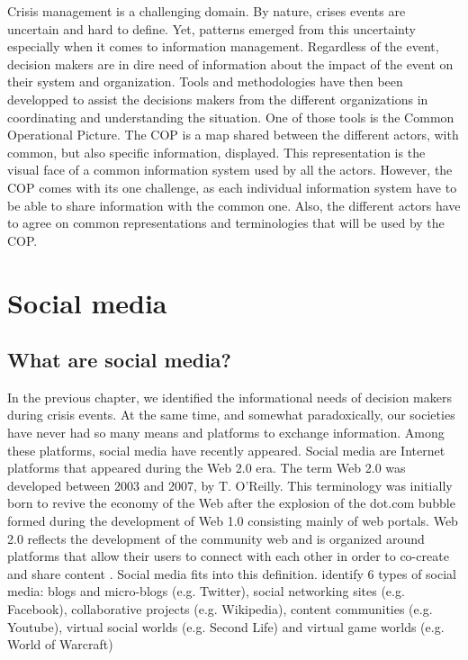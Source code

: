 Crisis management is a challenging domain.
By nature, crises events are uncertain and hard to define.
Yet, patterns emerged from this uncertainty especially when it comes to information management.
Regardless of the event, decision makers are in dire need of information about the impact of the event on their system and organization.
Tools and methodologies have then been developped to assist the decisions makers from the different organizations in coordinating and understanding the situation.
One of those tools is the Common Operational Picture.
The COP is a map shared between the different actors, with common, but also specific information, displayed.
This representation is the visual face of a common information system used by all the actors.
However, the COP comes with its one challenge, as each individual information system have to be able to share information with the common one.
Also, the different actors have to agree on common representations and terminologies that will be used by the COP.

\section{Social media}
\subsection{What are social media?}
In the previous chapter, we identified the informational needs of decision makers during crisis events.
At the same time, and somewhat paradoxically, our societies have never had so many means and platforms to exchange information.
Among these platforms, social media have recently appeared.
Social media are Internet platforms that appeared during the Web 2.0 era.
The term Web 2.0 was developed between 2003 and 2007, by T. O'Reilly.
This terminology was initially born to revive the economy of the Web after the explosion of the dot.com bubble formed during the development of Web 1.0 consisting mainly of web portals.
Web 2.0 reflects the development of the community web and is organized around platforms that allow their users to connect with each other in order to co-create and share content \cite{oreillyWhatWebDesign2007b}.
Social media fits into this definition.
\cite{kaplanUsersWorldUnite2010a} identify 6 types of social media: blogs and micro-blogs (e.g. Twitter), social networking sites (e.g. Facebook), collaborative projects (e.g. Wikipedia), content communities (e.g. Youtube), virtual social worlds (e.g. Second Life) and virtual game worlds (e.g. World of Warcraft)

